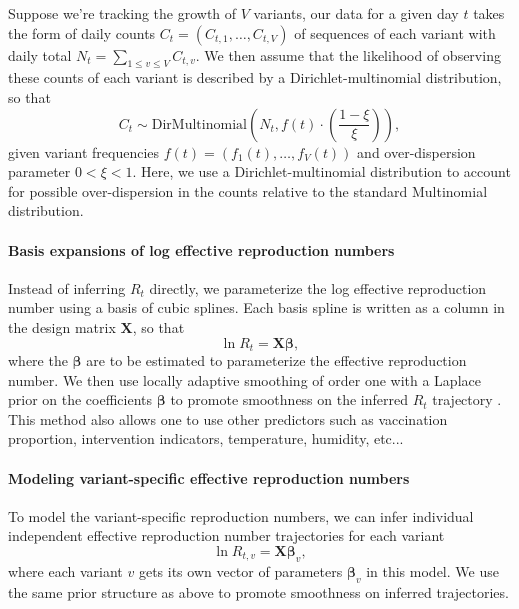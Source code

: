 \documentclass[11pt,oneside,letterpaper]{article}
\renewcommand{\vec}[1]{\boldsymbol{#1}}
\begin{document}
Suppose we're tracking the growth of $V$ variants, our data for a given day $t$ takes the form of daily counts $C_{t} = (C_{t,1}, \ldots, C_{t,V})$ of sequences of each variant with daily total $N_{t} = \sum_{1\leq v \leq V} C_{t, v}$.
We then assume that the likelihood of observing these counts of each variant is described by a Dirichlet-multinomial distribution, so that
\begin{equation}
    C_{t} \sim \text{DirMultinomial}\left(N_{t}, f(t)\cdot \left(\frac{1-\xi}{\xi}\right)\right),
\end{equation}
given variant frequencies $f(t) = (f_{1}(t), \ldots, f_{V}(t))$ and over-dispersion parameter $0<\xi<1$.
Here, we use a Dirichlet-multinomial distribution to account for possible over-dispersion in the counts relative to the standard Multinomial distribution.

\paragraph{Basis expansions of log effective reproduction numbers}%

Instead of inferring $R_{t}$ directly, we parameterize the log effective reproduction number using a basis of cubic splines.
Each basis spline is written as a column in the design matrix $\vec{X}$, so that
\begin{equation}
  \ln R_{t} = \vec{X} \vec{\beta},
\end{equation}
where the $\vec{\beta}$ are to be estimated to parameterize the effective reproduction number.
We then use locally adaptive smoothing of order one with a Laplace prior on the coefficients $\vec{\beta}$ to promote smoothness on the inferred $R_t$ trajectory \cite{Faulkner2018}.
This method also allows one to use other predictors such as vaccination proportion, intervention indicators, temperature, humidity, etc...

\paragraph{Modeling variant-specific effective reproduction numbers}%

To model the variant-specific reproduction numbers, we can infer individual independent effective reproduction number trajectories for each variant
\begin{equation}
  \ln R_{t, v} = \vec{X} \vec{\beta}_{v},
\end{equation}
where each variant $v$ gets its own vector of parameters $\vec{\beta}_{v}$ in this model.
We use the same prior structure as above to promote smoothness on inferred trajectories.  %
\end{document}
